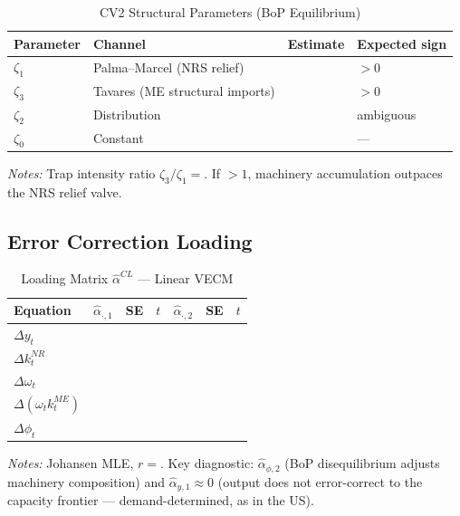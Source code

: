\begin{table}[htbp]
\centering
\caption{CV2 Structural Parameters (BoP Equilibrium)}
\label{tab:cl:sa:cv2_params}
\begin{threeparttable}
\begin{tabular}{llrl}
	\toprule
	Parameter & Channel & Estimate & Expected sign \\
	\midrule
	$\zeta_1$ & Palma--Marcel (NRS relief) &  & $> 0$ \\
	$\zeta_3$ & Tavares (ME structural imports) &  & $> 0$ \\
	$\zeta_2$ & Distribution &  & ambiguous \\
	$\zeta_0$ & Constant &  & --- \\
	\bottomrule
\end{tabular}
\begin{tablenotes}
	\small
	\item \textit{Notes:} Trap intensity ratio
	$\zeta_3/\zeta_1 = \text{}$. If $> 1$,
	machinery accumulation outpaces the NRS relief valve.
\end{tablenotes}
\end{threeparttable}
\end{table}




\subsection{Error Correction Loading}
\label{app:cl:alpha}

\begin{table}[htbp]
\centering
\caption{Loading Matrix $\hat{\alpha}^{CL}$ --- Linear VECM}
\label{tab:cl:sa:alpha}
\begin{threeparttable}
\begin{tabular}{lrrrrrr}
	\toprule
	Equation & $\hat{\alpha}_{\cdot,1}$ & SE & $t$
	& $\hat{\alpha}_{\cdot,2}$ & SE & $t$ \\
	\midrule
	$\Delta y_t$
	&  &  & 
	&  &  &  \\
	$\Delta k_t^{NR}$
	&  &  & 
	&  &  &  \\
	$\Delta \omega_t$
	&  &  & 
	&  &  &  \\
	$\Delta(\omega_t k_t^{ME})$
	&  &  & 
	&  &  &  \\
	$\Delta \phi_t$
	&  &  & 
	&  &  &  \\
	\bottomrule
\end{tabular}
\begin{tablenotes}
	\small
	\item \textit{Notes:} Johansen MLE, $r = \text{}$.
	Key diagnostic: $\hat{\alpha}_{\phi,2}$ (BoP disequilibrium
	adjusts machinery composition) and $\hat{\alpha}_{y,1} \approx 0$
	(output does not error-correct to the capacity frontier ---
	demand-determined, as in the US).
\end{tablenotes}
\end{threeparttable}
\end{table}


